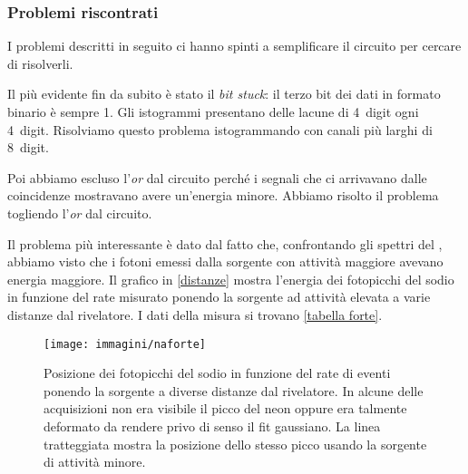 \subsubsection{Problemi riscontrati}

I problemi descritti in seguito ci hanno spinti a semplificare il circuito per cercare di risolverli.

Il più evidente fin da subito è stato il \emph{bit stuck}: il terzo bit dei dati in formato binario è sempre 1. Gli istogrammi presentano delle lacune di \SI{4}{digit} ogni \SI{4}{digit}. Risolviamo questo problema istogrammando con canali più larghi di \SI{8}{digit}.

Poi abbiamo escluso l'\emph{or} dal circuito perché i segnali che ci arrivavano dalle coincidenze mostravano avere un'energia minore. Abbiamo risolto il problema togliendo l'\emph{or} dal circuito.

Il problema più interessante è dato dal fatto che, confrontando gli spettri del \na{}, abbiamo visto che i fotoni emessi dalla sorgente con attività maggiore avevano energia maggiore.
Il grafico in \autoref{distanze} mostra l'energia dei fotopicchi del sodio in funzione del rate misurato ponendo la sorgente ad attività elevata a varie distanze dal rivelatore.
I dati della misura si trovano \autoref{tabella forte}.

\begin{figure}[h]
\centering
\texttt{[image: immagini/naforte]}
\caption{Posizione dei fotopicchi del sodio in funzione del rate di eventi ponendo la sorgente a diverse distanze dal rivelatore. In alcune delle acquisizioni non era visibile il picco del neon oppure era talmente deformato da rendere privo di senso il fit gaussiano. La linea tratteggiata mostra la posizione dello stesso picco usando la sorgente di attività minore.}
\label{distanze}
\end{figure}

